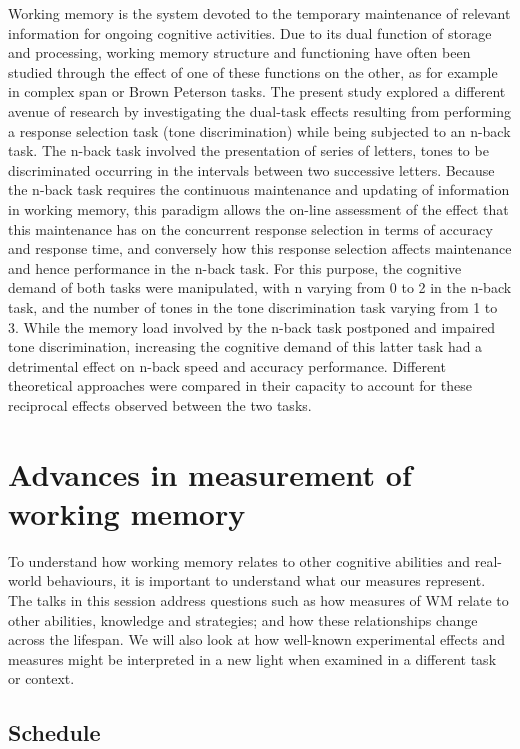 \documentclass[
  12pt,
]{book}
\begin{document}
Working memory is the system devoted to the temporary maintenance of relevant information for ongoing cognitive activities. Due to its dual function of storage and processing, working memory structure and functioning have often been studied through the effect of one of these functions on the other, as for example in complex span or Brown Peterson tasks. The present study explored a different avenue of research by investigating the dual-task effects resulting from performing a response selection task (tone discrimination) while being subjected to an n-back task. The n-back task involved the presentation of series of letters, tones to be discriminated occurring in the intervals between two successive letters. Because the n-back task requires the continuous maintenance and updating of information in working memory, this paradigm allows the on-line assessment of the effect that this maintenance has on the concurrent response selection in terms of accuracy and response time, and conversely how this response selection affects maintenance and hence performance in the n-back task. For this purpose, the cognitive demand of both tasks were manipulated, with n varying from 0 to 2 in the n-back task, and the number of tones in the tone discrimination task varying from 1 to 3. While the memory load involved by the n-back task postponed and impaired tone discrimination, increasing the cognitive demand of this latter task had a detrimental effect on n-back speed and accuracy performance. Different theoretical approaches were compared in their capacity to account for these reciprocal effects observed between the two tasks.

\hypertarget{advances-in-measurement-of-working-memory}{%
\chapter{Advances in measurement of working memory}\label{advances-in-measurement-of-working-memory}}

To understand how working memory relates to other cognitive abilities and real-world behaviours, it is important to understand what our measures represent. The talks in this session address questions such as how measures of WM relate to other abilities, knowledge and strategies; and how these relationships change across the lifespan. We will also look at how well-known experimental effects and measures might be interpreted in a new light when examined in a different task or context.

\hypertarget{schedule-4}{%
\section{Schedule}\label{schedule-4}}
\end{document}
